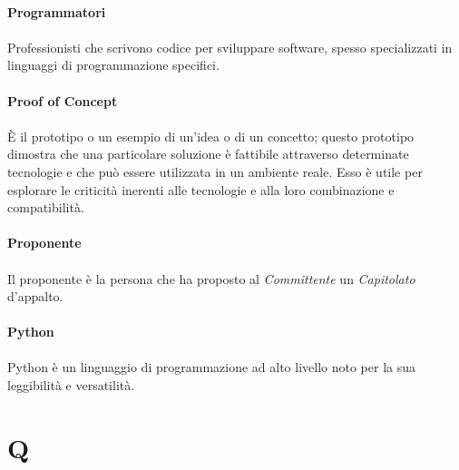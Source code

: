 \documentclass[10pt, a4paper]{article}
\begin{document}
\paragraph{Programmatori}\noindent\hrulefill
\paragraph{}Professionisti che scrivono codice per sviluppare software, spesso specializzati in linguaggi di programmazione specifici.


\vspace{2em}
\paragraph{Proof of Concept}\noindent\hrulefill
\paragraph{}È il prototipo o un esempio di un’idea o di un concetto; questo prototipo dimostra che una particolare soluzione è fattibile attraverso determinate tecnologie e che può essere utilizzata in un ambiente reale. Esso è utile per esplorare le criticità inerenti alle tecnologie e alla loro combinazione e compatibilità.

\vspace{2em}
\paragraph{Proponente}\noindent\hrulefill
\paragraph{}Il proponente è la persona che ha proposto al \textit{Committente\pg} un \textit{Capitolato\pg}
d’appalto.



\vspace{2em}
\paragraph{Python}\noindent\hrulefill
\paragraph{}Python è un linguaggio di programmazione ad alto livello noto per la sua leggibilità e versatilità.


\newpage
\section{Q}
\vspace{2em}
\end{document}
